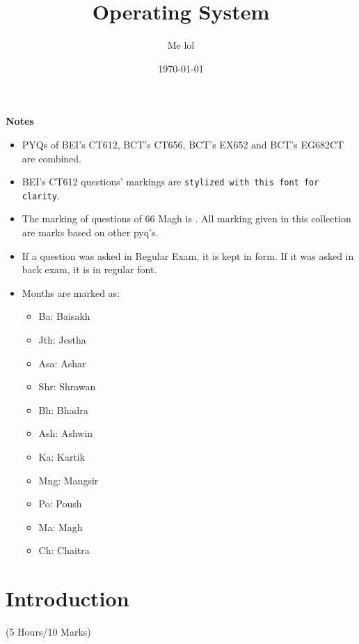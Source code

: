 \documentclass[12pt]{article}
\title{Operating System}
\author{Me lol}
\date{\today}
\begin{document}
\maketitle
\vspace{7cm}
\begin{large}\textbf{Notes}\end{large}
\begin{itemize}
	\item PYQs of BEI's CT612, BCT's CT656, BCT's EX652 and BCT's EG682CT are combined.
	\item BEI's CT612 questions' markings are \texttt{stylized with this font for clarity}.
	\item The marking of questions of 66 Magh is  . All marking given in this collection are  marks based on other pyq's. 
	\item If a question was asked in Regular Exam, it is kept in  form. If it was asked in back exam, it is in regular font.
	\item Months are marked as: 
	\begin{itemize}[noitemsep, topsep=0pt]
		\item Ba: Baisakh
		\item Jth: Jestha
		\item Asa: Ashar
		\item Shr: Shrawan
		\item Bh: Bhadra
		\item Ash: Ashwin
		\item Ka: Kartik
		\item Mng: Mangsir
		\item Po: Poush
		\item Ma: Magh
		\item Ch: Chaitra
	\end{itemize}
\end{itemize}
\pagebreak
\tableofcontents
\pagebreak

\section{Introduction}
	\begin{center}(5 Hours/10 Marks)\end{center}
\end{document}

